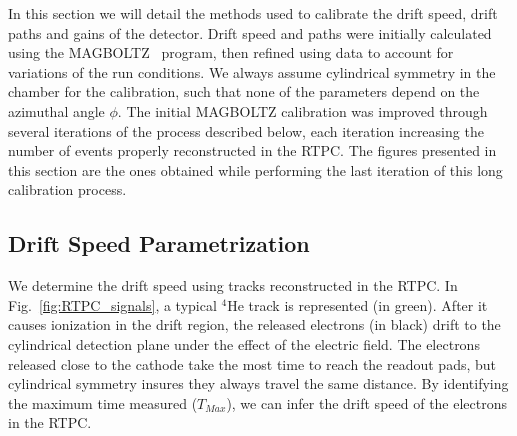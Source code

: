 \documentclass[preprint,5p]{elsarticle}
\begin{document}
In this section we will detail the methods used to calibrate the drift speed,
drift paths and gains of the detector. Drift speed and paths were initially
calculated using the MAGBOLTZ~\cite{MAGBOLTZ} program, then refined using
data to account for variations of the run conditions. We always assume 
cylindrical symmetry in the chamber for the calibration, such that none of
the parameters depend on the azimuthal angle $\phi$. The initial MAGBOLTZ
calibration was improved through several iterations of the
process described below, each iteration increasing the number of events 
properly reconstructed in the RTPC. The figures presented in this section
are the ones obtained while performing the last iteration of this long 
calibration process.

\subsection{Drift Speed Parametrization}

We determine the drift speed using tracks reconstructed in the RTPC. In 
Fig.~\ref{fig:RTPC_signals}, a typical $^{4}$He track is represented (in green). After 
it causes ionization in the drift region, the released electrons (in black) 
drift to the cylindrical detection plane under the effect of the electric field. The 
electrons released close to the cathode take the most time to reach the readout 
pads, but cylindrical symmetry insures they always travel the same 
distance. By identifying the maximum time measured ($T_{Max}$), we can infer the drift 
speed of the electrons in the RTPC.\\
\end{document}
